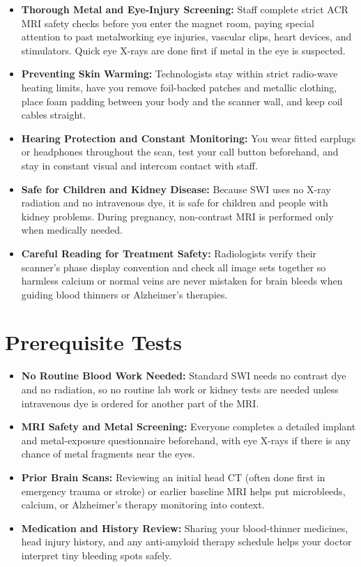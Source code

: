 \begin{itemize}
    \item \textbf{Thorough Metal and Eye-Injury Screening:} Staff complete strict ACR MRI safety checks before you enter the magnet room, paying special attention to past metalworking eye injuries, vascular clips, heart devices, and stimulators. Quick eye X-rays are done first if metal in the eye is suspected.
    \item \textbf{Preventing Skin Warming:} Technologists stay within strict radio-wave heating limits, have you remove foil-backed patches and metallic clothing, place foam padding between your body and the scanner wall, and keep coil cables straight.
    \item \textbf{Hearing Protection and Constant Monitoring:} You wear fitted earplugs or headphones throughout the scan, test your call button beforehand, and stay in constant visual and intercom contact with staff.
    \item \textbf{Safe for Children and Kidney Disease:} Because SWI uses no X-ray radiation and no intravenous dye, it is safe for children and people with kidney problems. During pregnancy, non-contrast MRI is performed only when medically needed.
    \item \textbf{Careful Reading for Treatment Safety:} Radiologists verify their scanner's phase display convention and check all image sets together so harmless calcium or normal veins are never mistaken for brain bleeds when guiding blood thinners or Alzheimer's therapies.
\end{itemize}

\section{Prerequisite Tests}

\begin{itemize}
    \item \textbf{No Routine Blood Work Needed:} Standard SWI needs no contrast dye and no radiation, so no routine lab work or kidney tests are needed unless intravenous dye is ordered for another part of the MRI.
    \item \textbf{MRI Safety and Metal Screening:} Everyone completes a detailed implant and metal-exposure questionnaire beforehand, with eye X-rays if there is any chance of metal fragments near the eyes.
    \item \textbf{Prior Brain Scans:} Reviewing an initial head CT (often done first in emergency trauma or stroke) or earlier baseline MRI helps put microbleeds, calcium, or Alzheimer's therapy monitoring into context.
    \item \textbf{Medication and History Review:} Sharing your blood-thinner medicines, head injury history, and any anti-amyloid therapy schedule helps your doctor interpret tiny bleeding spots safely.
\end{itemize}

